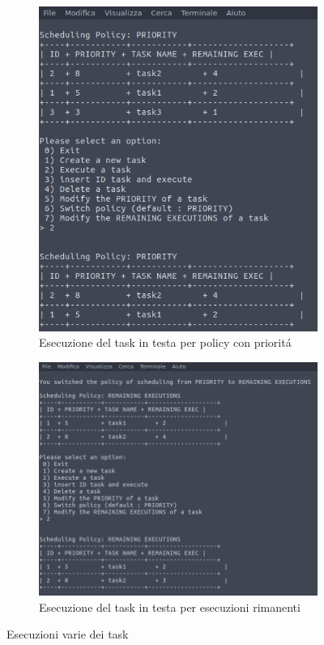 \begin{figure}
\begin{subfigure}[b]{0.4\textwidth}
\includegraphics[width=\textwidth]{progetto_so/procScheduler/screenshot/8_execute_task_with_priority}
\caption{Esecuzione del task in testa per policy con priorit\'a}
\end{subfigure}
\begin{subfigure}[b]{0.4\textwidth}
\includegraphics[width=\textwidth]{progetto_so/procScheduler/screenshot/10_execution_task_with_remaining_execution}
\caption{Esecuzione del task in testa per esecuzioni rimanenti}
\end{subfigure}
\caption{Esecuzioni varie dei task}
\end{figure}

